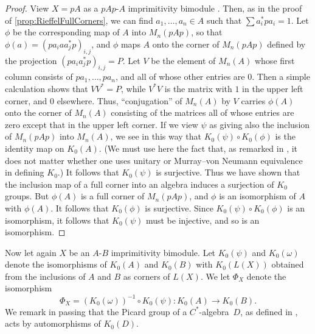 \documentclass{book}
\def\cstar{\(C^*\)-algebra}
\begin{document}
\begin{proof}
  View \(X=pA\) as a \(pAp\)-\(A\) imprimitivity bimodule
  \cite[Section~6.8]{Rieffel1974}.
  Then, as in the proof of \ref{prop:RieffelFullCorners}, we can find 
  \(a_1,\ldots,a_n\in A\) such that \(\sum a_i^* pa_i=1\). Let \(\phi\)
  be the corresponding map of \(A\) into \(M_n(pAp)\), so that \(\phi(a)=(pa_iaa_j^*p)_{i,j}\),
  and \(\phi\) maps \(A\) onto the corner of \(M_n(pAp)\) defined by the projection
  \((pa_ia_j^*p)_{i,j}=P\). Let \(V\) be the element of \(M_n(A)\) whose
  first column consists of \(pa_1,\ldots,pa_n\), and all of whose other entries are \(0\).
  Then a simple calculation shows that \(VV^*=P\), while \(V^*V\) is the matrix with \(1\) in the upper
  left corner, and \(0\) elsewhere. Thus, ``conjugation'' of \(M_n(A)\) by \(V\)
  carries \(\phi(A)\) onto the corner of \(M_n(A)\) consisting of the matrices all of whose
  entries are zero except that in the upper left corner. If we view \(\psi\)
  as giving also the inclusion of \(M_n(pAp)\) into \(M_n(A)\), we see in this way that 
  \(K_0(\psi)\circ K_0(\phi)\) is the identity map on \(K_0(A)\).
  (We must use here the fact that, as remarked in \cite[immediately after Lemma~3.6]{EffrosRosenberg1978}, it does not matter whether
  one uses unitary or Murray--von Neumann equivalence in defining \(K_0\).) It follows 
  that \(K_0(\psi)\) is surjective. Thus we have shown that the inclusion map of a full corner
  into an algebra induces a surjection of \(K_0\) groups.
  But \(\phi(A)\) is a full corner of \(M_n(pAp)\), and \(\phi\) is an isomorphism
  of \(A\) with \(\phi(A)\). It follows that \(K_0(\phi)\) is surjective. Since 
  \(K_0(\psi)\circ K_0(\phi)\) is an isomorphism, it follows that \(K_0(\psi)\) must 
  be injective, and so is an isomorphism.
\end{proof}
Now let again \(X\) be an \(A\)-\(B\) imprimitivity bimodule. Let
\(K_0(\psi)\) and \(K_0(\omega)\) denote the isomorphisms of \(K_0(A)\) and
\(K_0(B)\) with \(K_0(L(X))\) obtained from the inclusions of \(A\) and \(B\)
as corners of \(L(X)\). We let \(\Phi_X\) denote the isomorphism
\[
  \Phi_X=(K_0(\omega))^{-1}\circ K_0(\psi):K_0(A)\longrightarrow K_0(B).
\]
We remark in passing that the Picard group of a \cstar\ \(D\), as defined in
\cite{BrownGreenRieffel1977}, acts by automorphisms of \(K_0(D)\).
\end{document}

